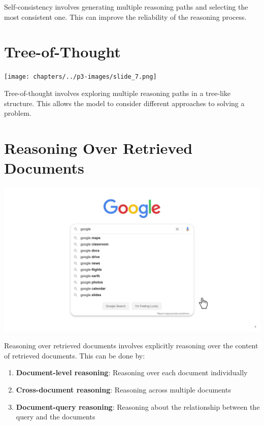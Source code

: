 \documentclass[
  letterpaper,
  oneside]{scrbook}
\providecommand{\tightlist}{%
  \setlength{\itemsep}{0pt}\setlength{\parskip}{0pt}}\usepackage{longtable,booktabs,array}
\begin{document}
Self-consistency involves generating multiple reasoning paths and
selecting the most consistent one. This can improve the reliability of
the reasoning process.

\section{Tree-of-Thought}\label{tree-of-thought}

\texttt{[image: chapters/../p3-images/slide\_7.png]}

Tree-of-thought involves exploring multiple reasoning paths in a
tree-like structure. This allows the model to consider different
approaches to solving a problem.

\section{Reasoning Over Retrieved
Documents}\label{reasoning-over-retrieved-documents}

\includegraphics{chapters/../p3-images/slide_8.png}

Reasoning over retrieved documents involves explicitly reasoning over
the content of retrieved documents. This can be done by:

\begin{enumerate}
\def\labelenumi{\arabic{enumi}.}
\tightlist
\item
  \textbf{Document-level reasoning}: Reasoning over each document
  individually
\item
  \textbf{Cross-document reasoning}: Reasoning across multiple documents
\item
  \textbf{Document-query reasoning}: Reasoning about the relationship
  between the query and the documents
\end{enumerate}
\end{document}
